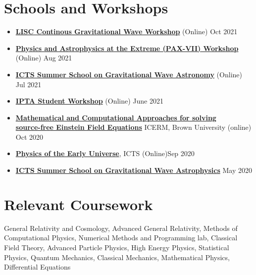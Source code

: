 \documentclass[margin, centered]{res}
\begin{document}
\begin{resume}
\section{Schools and Workshops}
\begin{itemize}[leftmargin=*]
    \item \href{https://youtu.be/zXDrQ_-WNUg}{\textbf{LISC Continous Gravitational Wave Workshop}} (Online) \hfill Oct 2021
    \item \href{https://sites.psu.edu/paxvii/}{\textbf{Physics and Astrophysics at the Extreme (PAX-VII) Workshop}} (Online) \hfill Aug 2021
	\item \href{https://www.icts.res.in/program/gws2021}{\textbf{ICTS Summer School on Gravitational Wave Astronomy}} (Online) \hfill Jul 2021 
	\item \href{http://ipta4gw.org/meetings/2021/}{\textbf{IPTA Student Workshop}} (Online) \hfill June 2021 
	\item \href{https://icerm.brown.edu/programs/sp-f20/w2/#workshopparticipants}{\textbf{Mathematical and Computational Approaches for solving \\ source-free Einstein Field Equations}} ICERM, Brown University (online) \hfill Oct 2020
	\item \href{https://www.icts.res.in/program/peu}{\textbf{Physics of the Early Universe}}, ICTS (Online)\hfill  Sep 2020 
	\item \href{https://www.icts.res.in/program/gws2020}{\textbf{ICTS Summer School on Gravitational Wave Astrophysics}} \hfill May 2020 
\end{itemize}

\section{Relevant Coursework}
General Relativity and Cosmology, Advanced General Relativity, Methods of Computational Physics, Numerical Methods and Programming lab, Classical Field Theory, Advanced Particle Physics, High Energy Physics, Statistical Physics, Quantum Mechanics, Classical Mechanics, 
Mathematical Physics, Differential Equations



\end{resume}
\end{document}
